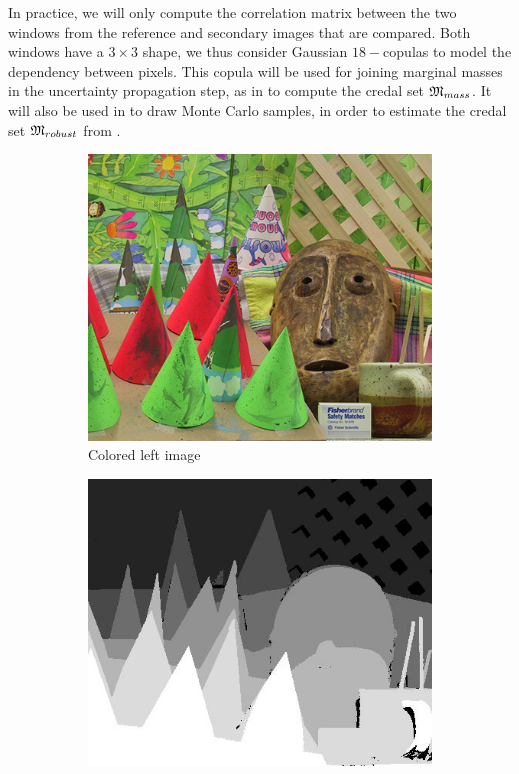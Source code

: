 In practice, we will only compute the correlation matrix between the two windows from the reference and secondary images that are compared. Both windows have a $3\times 3$ shape, we thus consider Gaussian $18-$copulas to model the dependency between pixels. This copula will be used for joining marginal masses in the uncertainty propagation step, as in  to compute the credal set $\mathfrak{M}_{mass}$. It will also be used in  to draw Monte Carlo samples, in order to estimate the credal set $\mathfrak{M}_{robust}$ from .

\begin{figure}
    \centering
    \begin{subfigure}[t]{0.5\linewidth}
        \centering
        \includegraphics[width=0.9\linewidth]{Images/Chap_4/im2.png}
        \caption{Colored left image}
        \label{fig:color_cones_image}
    \end{subfigure}\hfill
    \begin{subfigure}[t]{0.5\linewidth}
        \centering
        \includegraphics[width=0.9\linewidth]{Images/Chap_4/cluster.jpg}

\end{subfigure}
\end{figure}
